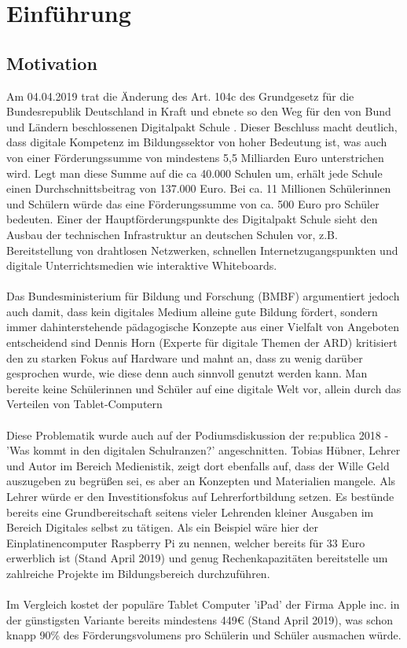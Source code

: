 \section{Einführung}\label{sec:einfuhrung}
\subsection{Motivation}\label{sec:motivation}

Am 04.04.2019 trat die Änderung des Art. 104c des Grundgesetz für die Bundesrepublik Deutschland in Kraft
und ebnete so den Weg für den von Bund und Ländern beschlossenen Digitalpakt Schule \cite{Art104cG55:online}. 
Dieser Beschluss macht deutlich, dass digitale Kompetenz im Bildungssektor von hoher Bedeutung ist, was auch von einer Förderungssumme von mindestens 5,5 Milliarden Euro unterstrichen wird. 
Legt man diese Summe auf die ca 40.000 Schulen um, erhält jede Schule einen Durchschnittsbeitrag von 137.000 Euro. Bei ca. 11 Millionen Schülerinnen und Schülern würde das eine Förderungssumme von ca. 500 Euro pro Schüler bedeuten. 
Einer der Hauptförderungspunkte des Digitalpakt Schule sieht den Ausbau der technischen Infrastruktur
an deutschen Schulen vor, z.B. Bereitstellung von drahtlosen Netzwerken, schnellen Internetzugangspunkten und digitale Unterrichtsmedien wie interaktive Whiteboards.
\\ \\
Das Bundesministerium für Bildung und Forschung (BMBF) argumentiert jedoch auch damit, dass kein digitales Medium alleine gute Bildung fördert, sondern immer dahinterstehende pädagogische Konzepte aus einer Vielfalt von Angeboten entscheidend sind \cite{dpakt2019:online} Dennis Horn (Experte für digitale Themen der ARD) kritisiert den zu starken Fokus auf Hardware und mahnt an, dass zu wenig darüber gesprochen wurde, wie diese denn auch sinnvoll genutzt werden kann. Man bereite keine Schülerinnen und Schüler auf eine digitale Welt vor, allein durch das Verteilen von Tablet-Computern\cite{Horn2018:online} \\ \\
Diese Problematik wurde auch auf der Podiumsdiskussion der re:publica 2018 - 'Was kommt in den digitalen Schulranzen?' angeschnitten. Tobias Hübner, Lehrer und Autor im Bereich Medienistik, zeigt dort ebenfalls auf, dass der Wille Geld auszugeben zu begrüßen sei, es aber an Konzepten und Materialien mangele. Als Lehrer würde er den Investitionsfokus auf Lehrerfortbildung setzen.
Es bestünde bereits eine Grundbereitschaft seitens vieler Lehrenden kleiner Ausgaben im Bereich Digitales selbst zu tätigen. Als ein Beispiel wäre hier der Einplatinencomputer Raspberry Pi zu nennen, welcher bereits für 33 Euro erwerblich ist (Stand April 2019) und genug Rechenkapazitäten bereitstelle um zahlreiche Projekte im Bildungsbereich durchzuführen. 
\\ \\
Im Vergleich kostet der populäre Tablet Computer 'iPad' der Firma Apple inc. in der günstigsten Variante bereits mindestens 449€ \cite{iPadmini65:online} (Stand April 2019), was schon knapp 90\% des Förderungsvolumens pro Schülerin und Schüler ausmachen würde.
\\ 

